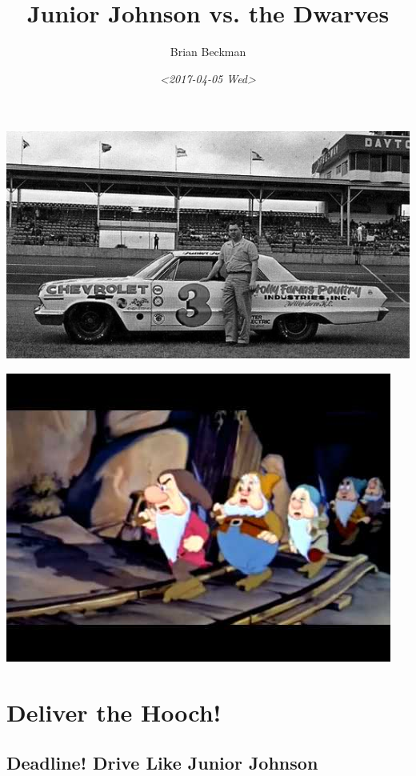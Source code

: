\documentclass[10pt,oneside,x11names]{article}
\author{Brian Beckman}
\date{\textit{<2017-04-05 Wed>}}
\title{Junior Johnson vs. the Dwarves}
\begin{document}
\maketitle
\setcounter{tocdepth}{2}
\tableofcontents


\section{}
\label{sec:orgb999c5b}
\begin{center}
\includegraphics[width=.9\linewidth]{./junior_johnson_3.jpg}
\end{center}\begin{center}
\includegraphics[width=.9\linewidth]{./hqdefault.jpg}
\end{center}
\section{Deliver the Hooch!}
\label{sec:org65306d3}
\subsection{Deadline! Drive Like Junior Johnson}
\label{sec:orgea489f7}
\end{document}
